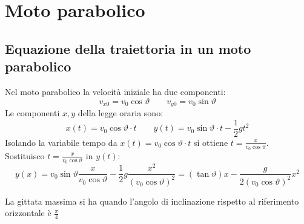 \section{Moto parabolico}

\subsection{Equazione della traiettoria in un moto parabolico}

Nel moto parabolico la velocità iniziale ha due componenti: \[v_{x0}=v_0\cos \vartheta\qquad v_{y0}=v_0\sin \vartheta\]
Le componenti $x,y$ della legge oraria sono: \[x(t)=v_0\cos \vartheta \cdot t \qquad y(t)=v_0\sin \vartheta \cdot t - \frac{1}{2}gt^2 \]
Isolando la variabile tempo da $x(t)=v_0\cos \vartheta \cdot t$ si ottiene $t=\frac{x}{v_0 \cos \vartheta}$.
Sostituisco $t=\frac{x}{v_0 \cos \vartheta}$ in $y(t)$: 
\begin{equation} 
y(x)=v_0 \sin\vartheta \frac{x}{v_0\cos\vartheta}-\frac{1}{2}g \frac{x^2}{(v_0\cos \vartheta)^2 }=(\tan \vartheta)x-\frac{g}{2(v_0\cos \vartheta)^2}x^2
\end{equation}

La gittata massima si ha quando l'angolo di inclinazione rispetto al riferimento orizzontale è $\frac{\pi}{4}$

